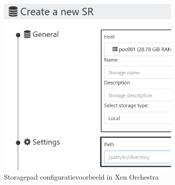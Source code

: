 \begin{figure}[H]
  \centering
  \includegraphics[width=0.8\textwidth]{../poc/storage-path-orch.png}
  \caption{Storagepad configuratievoorbeeld in Xen Orchestra}
  \label{fig:storage-path-orch}  
\end{figure}
